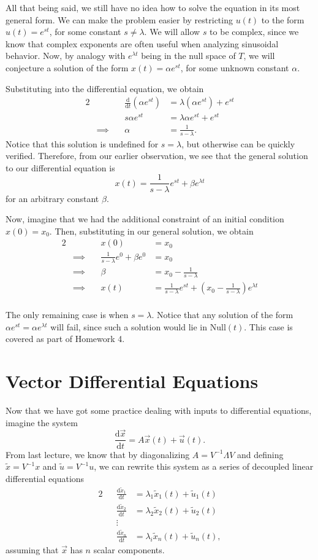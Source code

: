 \documentclass[letterpaper]{article}
\theoremstyle{remark}
\renewcommand{\tilde}[1]{\widetilde{#1}}
\newcommand{\dt}{\mathrm{d}t}
\newcommand{\diff}{\mathrm{d}}
\newcommand{\eqn}[1]{\begin{alignat*}{2}#1\end{alignat*}}
\newcommand*{\thus}{&\implies\quad&}
\begin{document}
All that being said, we still have no idea how to solve the equation in its most general form. We can make the problem easier by restricting $u(t)$ to the form $u(t) = e^{st}$, for some constant $s \ne \lambda$. We will allow $s$ to be complex, since we know that complex exponents are often useful when analyzing sinusoidal behavior. Now, by analogy with $e^{\lambda t}$ being in the null space of $T$, we will conjecture a solution of the form $x(t) = \alpha e^{st}$, for some unknown constant $\alpha$.

Substituting into the differential equation, we obtain
\eqn{
    && \frac{\diff}{\dt} (\alpha e^{st}) &= \lambda(\alpha e^{st}) + e^{st} \\
    && s\alpha e^{st} &= \lambda\alpha e^{st} + e^{st} \\
    \thus \alpha &= \frac{1}{s - \lambda}.
}
Notice that this solution is undefined for $s = \lambda$, but otherwise can be quickly verified. Therefore, from our earlier observation, we see that the general solution to our differential equation is
\[
    x(t) = \frac{1}{s - \lambda} e^{st} + \beta e^{\lambda t}
\]
for an arbitrary constant $\beta$.

Now, imagine that we had the additional constraint of an initial condition $x(0) = x_0$. Then, substituting in our general solution, we obtain
\eqn{
    && x(0) &= x_0 \\
    \thus \frac{1}{s - \lambda} e^{0} + \beta e^{0} &= x_0 \\
    \thus \beta &= x_0 - \frac{1}{s-\lambda} \\
    \thus x(t) &= \frac{1}{s - \lambda} e^{st} + \left( x_0 - \frac{1}{s-\lambda} \right)  e^{\lambda t} \\
}

The only remaining case is when $s = \lambda$. Notice that any solution of the form $\alpha e^{st} = \alpha e^{\lambda t}$ will fail, since such a solution would lie in $\text{Null}(t)$. This case is covered as part of Homework 4.

\section{Vector Differential Equations}
Now that we have got some practice dealing with inputs to differential equations, imagine the system
\[
    \frac{\diff \vec{x}}{\dt} = A\vec{x}(t) + \vec{u}(t).
\]
From last lecture, we know that by diagonalizing $A = V^{-1}\Lambda V$ and defining $\tilde{x} = V^{-1}x$ and $\tilde{u} = V^{-1}u$, we can rewrite this system as a series of decoupled linear differential equations
\eqn{
    && \frac{\diff \tilde{x}_1}{\dt} &= \lambda_1 \tilde{x}_1(t) + \tilde{u}_1(t) \\
    && \frac{\diff \tilde{x}_2}{\dt} &= \lambda_2 \tilde{x}_2(t) + \tilde{u}_2(t) \\
    && \vdots \\
    && \frac{\diff \tilde{x}_n}{\dt} &= \lambda_i \tilde{x}_n(t) + \tilde{u}_n(t),
}
assuming that $\vec{x}$ has $n$ scalar components. 
\end{document}
